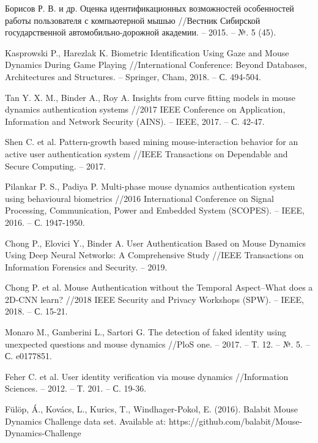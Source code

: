 \documentclass[12pt]{article}
\begin{document}
\begin{thebibliography}{20}
        Борисов Р. В. и др. Оценка идентификационных возможностей особенностей работы пользователя с компьютерной мышью //Вестник Сибирской государственной автомобильно-дорожной академии. – 2015. – №. 5 (45).

        Kasprowski P., Harezlak K. Biometric Identification Using Gaze and Mouse Dynamics During Game Playing //International Conference: Beyond Databases, Architectures and Structures. – Springer, Cham, 2018. – С. 494-504.

        Tan Y. X. M., Binder A., Roy A. Insights from curve fitting models in mouse dynamics authentication systems //2017 IEEE Conference on Application, Information and Network Security (AINS). – IEEE, 2017. – С. 42-47.

        Shen C. et al. Pattern-growth based mining mouse-interaction behavior for an active user authentication system //IEEE Transactions on Dependable and Secure Computing. – 2017.

        Pilankar P. S., Padiya P. Multi-phase mouse dynamics authentication system using behavioural biometrics //2016 International Conference on Signal Processing, Communication, Power and Embedded System (SCOPES). – IEEE, 2016. – С. 1947-1950.

        Chong P., Elovici Y., Binder A. User Authentication Based on Mouse Dynamics Using Deep Neural Networks: A Comprehensive Study //IEEE Transactions on Information Forensics and Security. – 2019.

        Chong P. et al. Mouse Authentication without the Temporal Aspect–What does a 2D-CNN learn? //2018 IEEE Security and Privacy Workshops (SPW). – IEEE, 2018. – С. 15-21.
        
        Monaro M., Gamberini L., Sartori G. The detection of faked identity using unexpected questions and mouse dynamics //PloS one. – 2017. – Т. 12. – №. 5. – С. e0177851.

        Feher C. et al. User identity verification via mouse dynamics //Information Sciences. – 2012. – Т. 201. – С. 19-36.

        Fülöp, Á., Kovács, L., Kurics, T., Windhager-Pokol, E. (2016). Balabit Mouse Dynamics Challenge data set. Available at: https://github.com/balabit/Mouse-Dynamics-Challenge


\end{thebibliography}
\end{document}
